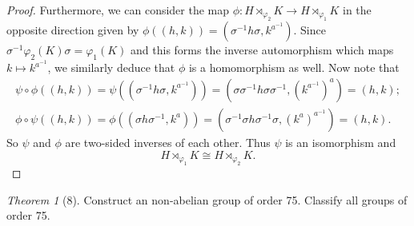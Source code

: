 \documentclass[12pt]{article}
\theoremstyle{remark}
\theoremstyle{named}
\newtheorem*{theorem}{Theorem}
\begin{document}
\begin{proof}
    Furthermore, we can consider the map \(\phi : H \rtimes_{\varphi_2} K \to H \rtimes_{\varphi_1} K\) in the opposite direction given by \(\phi((h, k)) = (\sigma^{-1}h\sigma, k^{a^{-1}})\). Since \(\sigma^{-1}\varphi_2(K)\sigma = \varphi_1(K)\) and this forms the inverse automorphism which maps \(k \mapsto k^{a^{-1}}\), we similarly deduce that \(\phi\) is a homomorphism as well. Now note that 
    \begin{align*}
        \psi \circ \phi ((h, k)) = \psi((\sigma^{-1}h\sigma, k^{a^{-1}})) = (\sigma\sigma^{-1}h\sigma\sigma^{-1}, (k^{a^{-1}})^a) = (h, k); \\
        \phi \circ \psi ((h, k)) = \phi((\sigma h\sigma^{-1}, k^{a})) = (\sigma^{-1}\sigma h\sigma^{-1}\sigma, (k^{a})^{a^{-1}}) = (h, k).
    \end{align*}
    So \(\psi\) and \(\phi\) are two-sided inverses of each other. Thus \(\psi\) is an isomorphism and 
    \[H \rtimes_{\varphi_1} K \cong H \rtimes_{\varphi_2} K.\]
\end{proof}

\begin{theorem}[8]
    Construct an non-abelian group of order 75. Classify all groups of order 75. 
\end{theorem}
\end{document}
